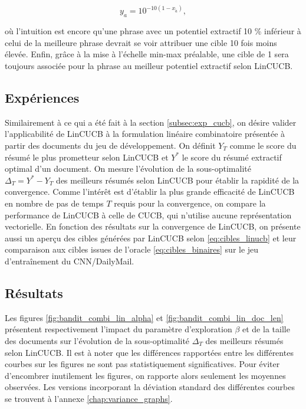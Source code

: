 \begin{equation}
    y_a = 10^{-10(1 - x_{\tilde{a}})},
    \label{eq:cibles_linucb}
\end{equation}

où l'intuition est encore qu'une phrase 
avec un potentiel extractif 10 \% inférieur à celui de la meilleure phrase 
devrait se voir attribuer une cible 10 fois moins élevée. 
Enfin, grâce à la mise à l'échelle min-max préalable, une cible de 1 
sera toujours associée pour la phrase au meilleur potentiel 
extractif selon LinCUCB.

\subsection{Expériences}

Similairement à ce qui a été fait à la section \ref{subsec:exp_cucb},
on désire valider l'applicabilité de LinCUCB à la formulation linéaire 
combinatoire présentée à partir des documents du jeu de développement.
On définit $Y_T$ comme le score du résumé le plus prometteur selon 
LinCUCB et $Y^*$ le score du résumé extractif optimal d'un document. 
On mesure l'évolution de la sous-optimalité $\Delta_T = Y^* - Y_T$ des meilleurs 
résumés selon LinCUCB pour établir la rapidité de la convergence.
Comme l'intérêt est d'établir la plus grande efficacité de LinCUCB 
en nombre de pas de temps $T$ requis pour la convergence, on 
compare la performance de LinCUCB à celle de CUCB, qui n'utilise
aucune représentation vectorielle.
En fonction des résultats sur la convergence de LinCUCB, 
on présente aussi un aperçu des cibles générées par LinCUCB selon \eqref{eq:cibles_linucb}
et leur comparaison aux cibles issues de l'oracle \eqref{eq:cibles_binaires}
sur le jeu d'entraînement du CNN/DailyMail.

\subsection{Résultats}
\label{subsec:results_clinucb}

Les figures \ref{fig:bandit_combi_lin_alpha} et \ref{fig:bandit_combi_lin_doc_len}
présentent respectivement l'impact du paramètre d'exploration $\beta$ et de 
la taille des documents sur l'évolution de la sous-optimalité $\Delta_T$ des meilleurs résumés 
selon LinCUCB.
Il est à noter que les différences rapportées entre les différentes 
courbes sur les figures ne sont pas statistiquement significatives.
Pour éviter d'encombrer inutilement les figures, on rapporte alors 
seulement les moyennes observées.
Les versions incorporant la déviation standard des différentes courbes 
se trouvent à l'annexe \ref{chap:variance_graphs}.

